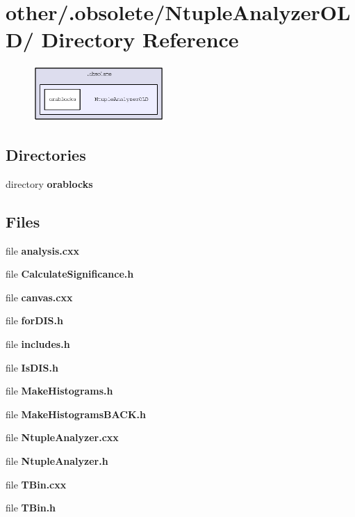 \section{other/.obsolete/Ntuple\-Analyzer\-OLD/ Directory Reference}
\label{dir_9bd7fc97a16f2fad97304b1feed7d35f}


\begin{figure}[H]
\begin{center}
\leavevmode
\includegraphics[width=141pt]{dir_9bd7fc97a16f2fad97304b1feed7d35f_dep}
\end{center}
\end{figure}
\subsection*{Directories}
\begin{CompactItemize}
\item 
directory \bf{orablocks}
\end{CompactItemize}
\subsection*{Files}
\begin{CompactItemize}
\item 
file \textbf{analysis.cxx}
\item 
file \textbf{Calculate\-Significance.h}
\item 
file \textbf{canvas.cxx}
\item 
file \textbf{for\-DIS.h}
\item 
file \textbf{includes.h}
\item 
file \textbf{Is\-DIS.h}
\item 
file \textbf{Make\-Histograms.h}
\item 
file \textbf{Make\-Histograms\-BACK.h}
\item 
file \textbf{Ntuple\-Analyzer.cxx}
\item 
file \textbf{Ntuple\-Analyzer.h}
\item 
file \textbf{TBin.cxx}
\item 
file \textbf{TBin.h}
\end{CompactItemize}
